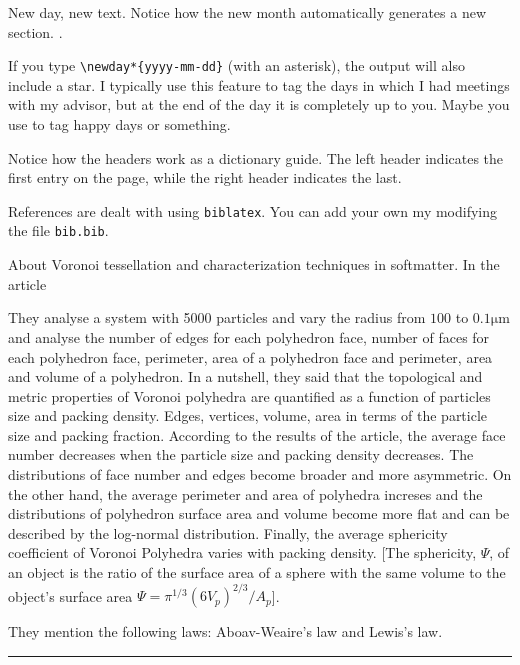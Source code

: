 \documentclass[a4paper, 11pt, oneside]{researchjournal} %
\begin{document}
 New day, new text. Notice how the new month automatically generates a new section. 
\daybib\cite{wald1984GeneralRelativity}.

 If you type \verb|\newday*{yyyy-mm-dd}| (with an asterisk), the output will also include a star. I typically use this feature to tag the days in which I had meetings with my advisor, but at the end of the day it is completely up to you. Maybe you use to tag happy days or something. 

 Notice how the headers work as a dictionary guide. The left header indicates the first entry on the page, while the right header indicates the last. 

 References are dealt with using \verb|biblatex|. You can add your own my modifying the file \verb|bib.bib|.

 About Voronoi tessellation and characterization techniques in softmatter.
In the article \textcite{yangVoronoiTessellationPacking2002} 

They analyse a system with 5000 particles and vary the radius from $100$ to $0.1\mathrm{\mu m}$ and analyse the number of edges for each polyhedron face, number of faces for each polyhedron face, perimeter, area of a polyhedron face and perimeter, area and volume of a polyhedron.
In a nutshell, they said that the topological and metric properties of Voronoi polyhedra are quantified as a function of particles size and packing density.
Edges, vertices, volume, area in terms of the particle size and packing fraction.
According to the results of the article, the average face number decreases when the particle size and packing density decreases.
The distributions of face number and edges become broader and more asymmetric.
On the other hand, the average perimeter and area of polyhedra increses and the distributions of polyhedron surface area and volume become more flat and can be described by the log-normal distribution.
Finally, the average sphericity coefficient of Voronoi Polyhedra varies with packing density.
[The sphericity, $ \Psi $, of an object is the ratio of the surface area of a sphere with the same volume to the object's surface area $\Psi=\pi^{1/3}\left(6V_{p}\right)^{2/3}/A_{p}$].

They mention the following laws: Aboav-Weaire's law and Lewis's law.


\rule{\textwidth}{0.4pt}
\end{document}
